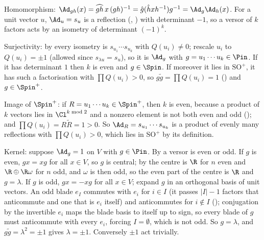 Homomorphism: $\Ad_{gh}(x) = \widehat{gh}\, x\, (gh)^{-1} = \hat{g}(\hat{h} x h^{-1}) g^{-1} = \Ad_g \Ad_h (x)$. For a unit vector $u$, $\Ad_u = s_u$ is a reflection (, ) with determinant $-1$, so a versor of $k$ factors acts by an isometry of determinant $(-1)^{k}$.

Surjectivity: by  every isometry is $s_{u_1} \cdots s_{u_k}$ with $Q(u_i) \ne 0$; rescale $u_i$ to $Q(u_i) = \pm 1$ (allowed since $s_{\lambda u} = s_u$), so it is $\Ad_g$ with $g = u_1 \cdots u_k \in \Pin$. If it has determinant $1$ then $k$ is even and $g \in \Spin$. If moreover it lies in $\mathrm{SO}^{+}$, it has such a factorisation with $\prod Q(u_i) > 0$, so $g \tilde{g} = \prod Q(u_i) = 1$ () and $g \in \Spin^{+}$.

Image of $\Spin^{+}$: if $R = u_1 \cdots u_k \in \Spin^{+}$, then $k$ is even, because a product of $k$ vectors lies in $\Cl^{k \bmod 2}$ and a nonzero element is not both even and odd (); and $\prod Q(u_i) = R \tilde{R} = 1 > 0$. So $\Ad_R = s_{u_1} \cdots s_{u_k}$ is a product of evenly many reflections with $\prod Q(u_i) > 0$, which lies in $\mathrm{SO}^{+}$ by its definition.

Kernel: suppose $\Ad_g = 1$ on $V$ with $g \in \Pin$. By  a versor is even or odd. If $g$ is even, $g x = x g$ for all $x \in V$, so $g$ is central; by  the centre is $\R$ for $n$ even and $\R \oplus \R\omega$ for $n$ odd, and $\omega$ is then odd, so the even part of the centre is $\R$ and $g = \lambda$. If $g$ is odd, $g x = -x g$ for all $x \in V$; expand $g$ in an orthogonal basis of unit vectors. An odd blade $e_I$ commutes with $e_i$ for $i \in I$ (it passes $|I| - 1$ factors that anticommute and one that is $e_i$ itself) and anticommutes for $i \notin I$ (); conjugation by the invertible $e_i$ maps the blade basis to itself up to sign, so every blade of $g$ must anticommute with every $e_i$, forcing $I = \emptyset$, which is not odd. So $g = \lambda$, and $g\tilde{g} = \lambda^{2} = \pm 1$ gives $\lambda = \pm 1$. Conversely $\pm 1$ act trivially.
